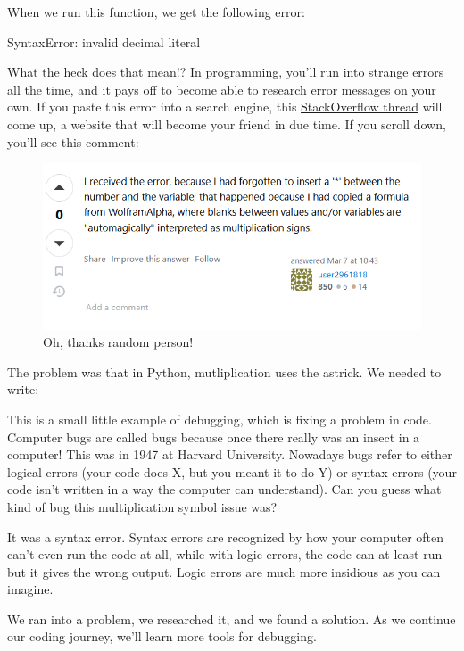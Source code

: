 \documentclass[12pt]{scrartcl}
\begin{document}
When we run this function, we get the following error:
\begin{code}
    SyntaxError: invalid decimal literal
\end{code}
What the heck does that mean!? In programming, you'll run into strange errors all the time, and it pays off to become able to research error messages on your own. If you paste this error into a search engine, this \hyperlink{https://stackoverflow.com/questions/59813807/understanding-invalid-decimal-literal}{StackOverflow thread} will come up, a website that will become your friend in due time. If you scroll down, you'll see this comment:
\begin{figure}[H]
    \centering
    \includegraphics[scale=0.6]{Helpful Message.png}
    \caption*{Oh, thanks random person!}
\end{figure}
The problem was that in Python, mutliplication uses the astrick. We needed to write:
\begin{center}
\end{center}
This is a small little example of debugging, which is fixing a problem in code. Computer bugs are called bugs because once there really was an insect in a computer! This was in 1947 at Harvard University. Nowadays bugs refer to either logical errors (your code does X, but you meant it to do Y) or syntax errors (your code isn't written in a way the computer can understand). Can you guess what kind of bug this multiplication symbol issue was?

It was a syntax error. Syntax errors are recognized by how your computer often can't even run the code at all, while with logic errors, the code can at least run but it gives the wrong output. Logic errors are much more insidious as you can imagine.

We ran into a problem, we researched it, and we found a solution. As we continue our coding journey, we'll learn more tools for debugging.
\end{document}
